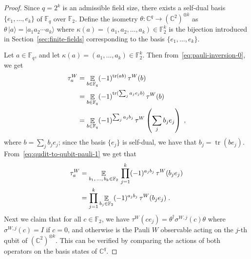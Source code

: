 \documentclass[11pt]{article}
\theoremstyle{definition}
\newcommand{\ket}[1]{|#1\rangle}
\newcommand{\Id}{\ensuremath{I}}
\newcommand{\C}{\ensuremath{\mathbb{C}}}
\newcommand{\F}{\ensuremath{\mathbb{F}}}
\DeclareMathOperator{\tr}{tr}
\newcommand{\E}{\mathop{\mathbb{E}}\displaylimits} %
\begin{document}
\begin{proof}
  Since $q = 2^k$ is an admissible field size, there exists a self-dual basis
  $\{e_1,\ldots,e_{k}\}$ of $\F_q$ over $\F_2$.
  Define the isometry $\theta : \C^q \to (\C^2)^{\otimes k}$ as $\theta\,
  \ket{a} = \ket{a_1 a_2 \cdots a_k}$ where $\kappa(a) = (a_1, a_2, \ldots, a_k)
  \in \F_2^k$ is the bijection introduced in Section~\ref{sec:finite-fields}
  corresponding to the basis $\{e_1,\ldots,e_k\}$.

  Let $a \in \F_q$, and let $\kappa(a) = (a_1,\ldots,a_k) \in \F_2^k$.
  Then from~\eqref{eq:pauli-inversion-0}, we get
  \begin{equation}
    \label{eq:qudit-to-qubit-pauli-1}
    \begin{split}
      \tau^W_a
      & = \E_{b \in \F_q} (-1)^{\tr(a b)} \, \tau^W(b) \\
      & = \E_{b \in \F_q} (-1)^{\tr(\sum_j a_j e_j b)} \, \tau^W(b) \\
      & = \E_{b \in \F_q} (-1)^{\sum_j a_j b_j} \,
      \tau^W \left ( \sum_j b_j e_j \right) \;,
    \end{split}
  \end{equation}
  where $b = \sum_j b_j e_j$; since the basis $\{e_j \}$ is self-dual, we have
  that $b_j = \tr(b e_j)$. From~\eqref{eq:qudit-to-qubit-pauli-1} we get that
  \begin{equation}
		\label{eq:qudit-to-qubit-pauli}
    \begin{split}
      \tau^W_a & = \E_{b_1,\, \ldots,\, b_k \in \F_2}\,
      \prod_{j=1}^k (-1)^{a_j b_j} \, \tau^W(b_j e_j) \\
      & = \prod_{j=1}^k \E_{b_j \in \F_2} (-1)^{a_j b_j} \, \tau^W(b_j e_j)\;.
    \end{split}
  \end{equation}
  Next we claim that for all $c \in \F_2$, we have $\tau^W(c e_j) =
  \theta^\dagger \sigma^{W,j} (c) \theta$ where $\sigma^{W,j}(c) = \Id$ if $c =
  0$, and otherwise is the Pauli $W$ observable acting on the $j$-th qubit of
  $(\C^2)^{\otimes k}$. This can be verified by comparing the actions of both
  operators on the basis states of $\C^q$.
  

\end{proof}
\end{document}
